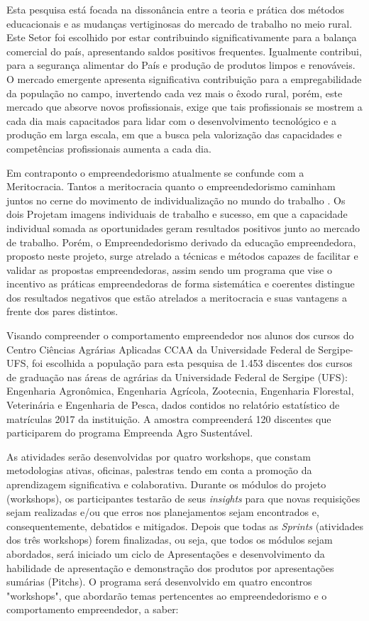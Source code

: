 Esta pesquisa está focada na dissonância entre a teoria e prática dos métodos educacionais e as mudanças vertiginosas do mercado de trabalho no meio rural. Este Setor foi escolhido por estar contribuindo significativamente para a balança comercial do país, apresentando saldos positivos frequentes. Igualmente contribui, para a segurança alimentar do País e produção de produtos limpos e renováveis. O mercado emergente apresenta significativa contribuição para a empregabilidade da população no campo, invertendo cada vez mais o êxodo rural, porém, este mercado que absorve novos profissionais, exige que tais profissionais se mostrem a cada dia mais capacitados para lidar com o desenvolvimento tecnológico e a produção em larga escala, em que a busca pela valorização das capacidades e competências profissionais aumenta a cada dia. 

Em contraponto o empreendedorismo atualmente se confunde com a Meritocracia. Tantos a meritocracia quanto o empreendedorismo caminham juntos no cerne do movimento de individualização no mundo do trabalho \cite{costa_novo_2019}. Os dois  Projetam imagens individuais de trabalho e sucesso, em que a capacidade individual somada as oportunidades geram resultados positivos junto ao mercado de trabalho. Porém, o Empreendedorismo derivado da educação empreendedora, proposto neste projeto, surge atrelado a técnicas e métodos capazes de facilitar e validar as propostas empreendedoras, assim sendo um programa que vise o incentivo as práticas empreendedoras de forma sistemática e coerentes distingue dos resultados negativos que estão atrelados a meritocracia e suas vantagens a frente dos pares distintos.

Visando compreender o comportamento empreendedor nos alunos dos cursos do Centro Ciências Agrárias Aplicadas CCAA da Universidade Federal de Sergipe-UFS, foi escolhida a população para esta pesquisa de 1.453 discentes dos cursos de graduação nas áreas de agrárias da Universidade Federal de Sergipe (UFS): Engenharia Agronômica, Engenharia Agrícola, Zootecnia, Engenharia Florestal, Veterinária e Engenharia de Pesca, dados contidos no relatório estatístico de matrículas 2017 da instituição. A amostra compreenderá  120 discentes que participarem do programa Empreenda Agro Sustentável.

As atividades serão desenvolvidas por quatro workshops, que constam metodologias ativas, oficinas, palestras tendo em conta a promoção da aprendizagem significativa e colaborativa. Durante os módulos do projeto (workshops), os participantes testarão de seus \textit{insights} para que novas requisições sejam realizadas e/ou que erros nos planejamentos sejam encontrados e, consequentemente, debatidos e mitigados. Depois que todas as \textit{Sprints} (atividades dos três workshops) forem finalizadas, ou seja, que todos os módulos sejam abordados, será iniciado um ciclo de Apresentações e desenvolvimento da habilidade de apresentação e demonstração dos produtos por apresentações sumárias (Pitchs). O programa será desenvolvido em quatro encontros "workshops", que abordarão temas pertencentes ao empreendedorismo e o comportamento empreendedor, a saber: 

